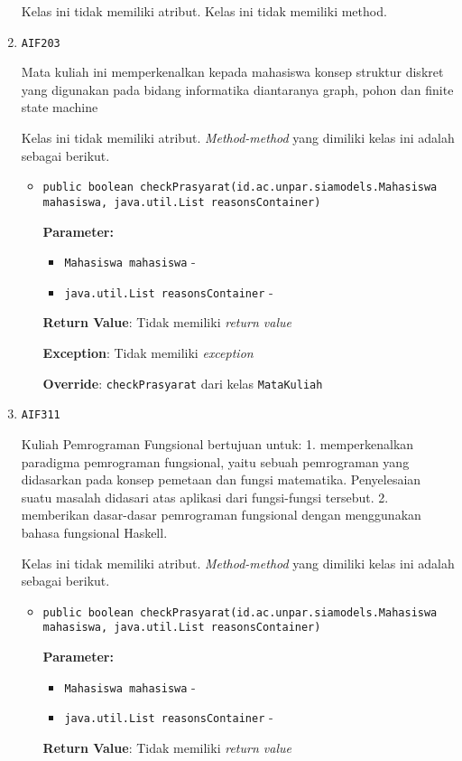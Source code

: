 \documentclass{article}
\begin{document}
\begin{enumerate}
Kelas ini tidak memiliki atribut. Kelas ini tidak memiliki method. \item \texttt{AIF203}

Mata kuliah ini memperkenalkan kepada mahasiswa konsep struktur diskret yang 
 digunakan pada bidang informatika diantaranya graph, pohon dan finite state 
 machine

Kelas ini tidak memiliki atribut. \textit{Method-method} yang dimiliki kelas ini adalah sebagai berikut.
\begin{itemize}
\item \texttt{public boolean checkPrasyarat(id.ac.unpar.siamodels.Mahasiswa mahasiswa, java.util.List reasonsContainer)}

\textbf{Parameter:}
\begin{itemize}
\item \texttt{Mahasiswa mahasiswa} - 
\item \texttt{java.util.List reasonsContainer} - 
\end{itemize}
\textbf{Return Value}: Tidak memiliki \textit{return value}

\textbf{Exception}: Tidak memiliki \textit{exception}

\textbf{Override}: \texttt{checkPrasyarat} dari kelas \texttt{MataKuliah}

\end{itemize}
\item \texttt{AIF311}

Kuliah Pemrograman Fungsional bertujuan untuk: 1. memperkenalkan paradigma
 pemrograman fungsional, yaitu sebuah pemrograman yang didasarkan pada konsep
 pemetaan dan fungsi matematika. Penyelesaian suatu masalah didasari atas
 aplikasi dari fungsi-fungsi tersebut. 2. memberikan dasar-dasar pemrograman
 fungsional dengan menggunakan bahasa fungsional Haskell.

Kelas ini tidak memiliki atribut. \textit{Method-method} yang dimiliki kelas ini adalah sebagai berikut.
\begin{itemize}
\item \texttt{public boolean checkPrasyarat(id.ac.unpar.siamodels.Mahasiswa mahasiswa, java.util.List reasonsContainer)}

\textbf{Parameter:}
\begin{itemize}
\item \texttt{Mahasiswa mahasiswa} - 
\item \texttt{java.util.List reasonsContainer} - 
\end{itemize}
\textbf{Return Value}: Tidak memiliki \textit{return value}


\end{itemize}
\end{enumerate}
\end{document}
